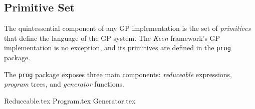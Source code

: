 
\subsection{Primitive Set}
\label{sec:keen:gp:primitives}
  The quintessential component of any GP implementation is the set of
  \textit{primitives} that define the language of the GP system. The
  \textit{Keen} framework's GP implementation is no exception, and its
  primitives are defined in the \texttt{prog} package.

  The \texttt{prog} package exposes three main components: \emph{reduceable}
  expressions, \emph{program} trees, and \emph{generator} functions.

  {Reduceable.tex}
  {Program.tex}
  {Generator.tex}
